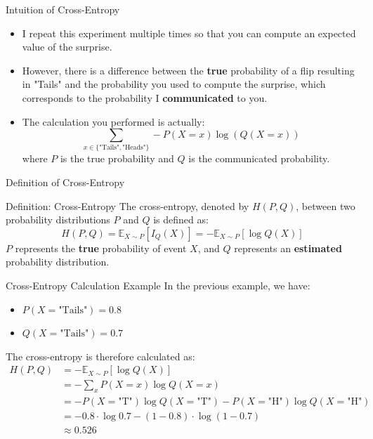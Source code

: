 \begin{frame}{Intuition of Cross-Entropy}
	\begin{itemize}
		\item I repeat this experiment multiple times so that you can compute an expected value of the surprise.
		\pause
		\item However, there is a difference between the \textbf{true} probability of a flip resulting in "Tails" and the probability you used to compute the surprise, which corresponds to the probability I \textbf{communicated} to you.
		\pause
		\item The calculation you performed is actually:
		\begin{equation*}
			\sum_{x \in \{\text{"Tails"}, \text{"Heads"}\}} - P(X = x) \log(Q(X = x))
		\end{equation*}
		where $P$ is the true probability and $Q$ is the communicated probability.
	\end{itemize}
\end{frame}

\begin{frame}{Definition of Cross-Entropy}
	\begin{block}{Definition: Cross-Entropy}
		The cross-entropy, denoted by $H(P, Q)$, between two probability distributions $P$ and $Q$ is defined as:
		\begin{equation*}
			H(P,Q) = \mathbb{E}_{X \sim P}\left[I_Q(X)\right] = - \mathbb{E}_{X \sim P}\left[\log Q(X)\right]
		\end{equation*}
		$P$ represents the \textbf{true} probability of event $X$, and $Q$ represents an \textbf{estimated} probability distribution.
	\end{block}
\end{frame}

\begin{frame}{Cross-Entropy Calculation Example}
	In the previous example, we have:
	\begin{itemize}
		\item $P(X=\text{"Tails"}) = 0.8$
		\item $Q(X=\text{"Tails"}) = 0.7$
	\end{itemize}
	\pause
	The cross-entropy is therefore calculated as:
	\begin{equation*}
		\begin{aligned}
			H(P,Q)
			&= - \mathbb{E}_{X \sim P}\left[\log Q(X)\right] \\
			&= - \sum_{x} P(X = x) \log{Q(X = x)} \\
			&= - P(X = \text{"T"}) \log{Q(X = \text{"T"})} - P(X = \text{"H"}) \log{Q(X = \text{"H"})} \\
			&= - 0.8 \cdot \log{0.7} - (1 - 0.8) \cdot \log{(1 - 0.7)} \\
			&\approx 0.526
		\end{aligned}
	\end{equation*}
\end{frame}

